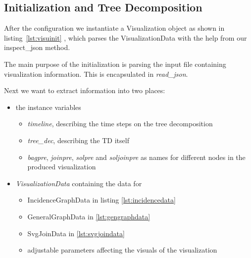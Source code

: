\documentclass[a4paper, 12pt]{scrartcl}
\begin{document}
\subsection{Initialization and Tree Decomposition}

After the configuration we instantiate a Visualization object as shown in listing~\ref{lst:visuinit} , which parses the VisualizationData with the help from our inspect\_json method. 

The main purpose of the initialization is parsing the input file containing visualization information.
This is encapsulated in \textit{read\_json}.

Next we want to extract information into two places: 
\begin{itemize}
	\item the instance variables 
	\begin{itemize}
		\item \textit{timeline}, describing the time steps on the tree decomposition
		\item \textit{tree\_dec}, describing the TD itself
		\item \textit{bagpre}, \textit{joinpre}, \textit{solpre} and \textit{soljoinpre} as names for different nodes in the produced visualization
	\end{itemize}
	\item \textit{VisualizationData} containing the data for 
	\begin{itemize}
		\item IncidenceGraphData in listing \ref{lst:incidencedata}
		\item GeneralGraphData in \ref{lst:gengraphdata}
		\item SvgJoinData in \ref{lst:svgjoindata}
		\item adjustable parameters affecting the visuals of the visualization
	\end{itemize}
\end{itemize}
\end{document}
